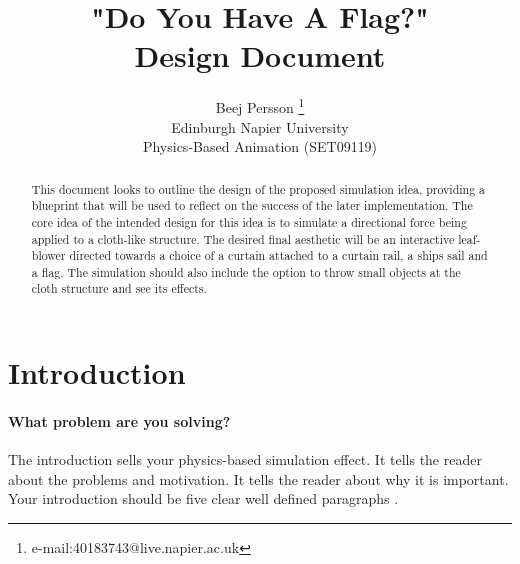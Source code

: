\documentclass[conference,backref=page]{acmsiggraph}
\title{"Do You Have A Flag?"\\
	   Design Document}
\author{Beej Persson \thanks{e-mail:40183743@live.napier.ac.uk} \\
Edinburgh Napier University\\
Physics-Based Animation (SET09119)}
\begin{document}

\maketitle

\raggedbottom

\begin{abstract}

This document looks to outline the design of the proposed simulation idea, providing a blueprint that will be used to reflect on the success of the later implementation. The core idea of the intended design for this idea is to simulate a directional force being applied to a cloth-like structure. The desired final aesthetic will be an interactive leaf-blower directed towards a choice of a curtain attached to a curtain rail, a ships sail and a flag. The simulation should also include the option to throw small objects at the cloth structure and see its effects.

\end{abstract}



\keywordlist





\section{Introduction}


\paragraph{What problem are you solving?}
The introduction sells your physics-based simulation effect.  It tells the reader about the problems and motivation.  It tells the reader about why it is important.  Your introduction should be five clear well defined paragraphs \cite{day2012write}.
\end{document}
